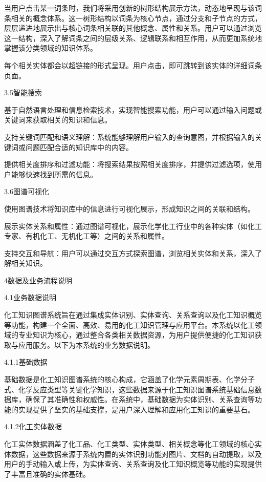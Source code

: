 当用户点击某一词条时，我们将采用创新的树形结构展示方法，动态地呈现与该词条相关的概念体系。这一树形结构以词条为核心节点，通过分支和子节点的方式，层层递进地展示出与核心词条相关联的其他概念、属性和关系。用户可以通过浏览这一结构，深入了解词条之间的层级关系、逻辑联系和相互作用，从而更加系统地掌握该分类领域的知识体系。



每个相关实体都会以超链接的形式呈现。用户点击，即可跳转到该实体的详细词条页面。

3.5智能搜索

基于自然语言处理和信息检索技术，实现智能搜索功能，用户可以通过输入问题或关键词来获取相关的知识和信息。

支持关键词匹配和语义理解：系统能够理解用户输入的查询意图，并根据输入的关键词或问题匹配合适的知识库中的内容。

提供相关度排序和过滤功能：将搜索结果按照相关度排序，并提供过滤选项，使用户能够快速找到所需的信息。



3.6图谱可视化

使用图谱技术将知识库中的信息进行可视化展示，形成知识之间的关联和结构。

展示实体关系和属性：通过图谱可视化，展示化学化工行业中的各种实体（如化工专家、有机化工、无机化工等）之间的关系和属性。

支持交互和导航：用户可以通过交互方式探索图谱，浏览相关实体和关系，深入了解相关知识。



4数据及业务流程说明

4.1业务数据说明

化工知识图谱系统旨在通过集成实体识别、实体查询、关系查询以及化工知识概览等功能，构建一个全面、高效、易用的化工知识管理与应用平台。本系统以化工领域的专业知识为核心，通过整合各类相关数据资源，为用户提供便捷的化工知识获取与应用服务。以下为本系统的业务数据说明。

4.1.1基础数据

基础数据是化工知识图谱系统的核心构成，它涵盖了化学元素周期表、化学分子式、化学反应类型等关键化学知识，这些数据来源于化工知识图谱系统基础信息数据库，确保了其准确性和权威性。在系统中，基础数据为实体识别、关系查询等功能的实现提供了坚实的基础支撑，是用户深入理解和应用化工知识的重要基石。

4.1.2化工实体数据

化工实体数据涵盖了化工品、化工类型、实体类型、相关概念等化工领域的核心实体数据，这些数据来源于系统内置的实体识别功能对图片、文档的自动提取，以及用户的手动输入或上传，为实体查询、关系查询及化工知识概览等功能的实现提供了丰富且准确的实体基础。

